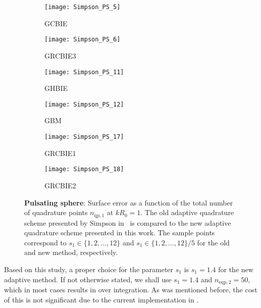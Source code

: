 \begin{figure}
	\begin{subfigure}{0.49\textwidth}
		\centering
		\texttt{[image: Simpson\_PS\_5]}
		\caption{GCBIE}
	\end{subfigure}%
	\hspace*{0.02\textwidth}%
	\begin{subfigure}{0.49\textwidth}
		\centering
		\texttt{[image: Simpson\_PS\_6]}
		\caption{GRCBIE3}
	\end{subfigure}
	\par\bigskip
	\par\bigskip
	\begin{subfigure}{0.49\textwidth}
		\centering
		\texttt{[image: Simpson\_PS\_11]}
		\caption{GHBIE}
	\end{subfigure}%
	\hspace*{0.02\textwidth}%
	\begin{subfigure}{0.49\textwidth}
		\centering
		\texttt{[image: Simpson\_PS\_12]}
		\caption{GBM}
	\end{subfigure}
	\par\bigskip
	\par\bigskip
	\begin{subfigure}{0.49\textwidth}
		\centering
		\texttt{[image: Simpson\_PS\_17]}
		\caption{GRCBIE1}
	\end{subfigure}%
	\hspace*{0.02\textwidth}%
	\begin{subfigure}{0.49\textwidth}
		\centering
		\texttt{[image: Simpson\_PS\_18]}
		\caption{GRCBIE2}
	\end{subfigure}
	\caption{\textbf{Pulsating sphere}: Surface error as a function of the total number of quadrature points $n_{\mathrm{qp,1}}$ at $kR_0=1$.  The old adaptive quadrature scheme presented by Simpson in~\cite{Simpson2014aib} is compared to the new adaptive quadrature scheme presented in this work. The sample points correspond to $s_1\in\{1,2,\dots,12\}$ and $s_1\in\{1,2,\dots,12\}/5$ for the old and new method, respectively.}
	\label{Fig3:Simpson_PS_2}
\end{figure}
Based on this study, a proper choice for the parameter $s_1$ is $s_1=1.4$ for the new adaptive method. If not otherwise stated, we shall use $s_1=1.4$ and $n_{\mathrm{eqp},2}=50$, which in most cases results in over integration. As was mentioned before, the cost of this is not significant due to the current implementation in \MATLAB.

